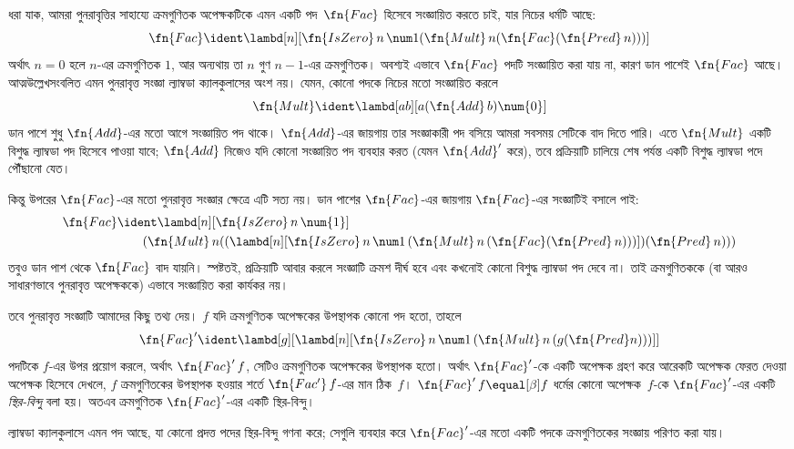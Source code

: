 \documentclass[../../../include/open-logic-section]{subfiles}
\begin{document}


ধরা যাক, আমরা পুনরাবৃত্তির সাহায্যে ক্রমগুণিতক অপেক্ষকটিকে এমন একটি
পদ~$\fn{Fac}$ হিসেবে সংজ্ঞায়িত করতে চাই, যার নিচের ধর্মটি আছে:
\[
\fn{Fac} \ident \lambd[n][\fn{IsZero}\, n\, \num 1 (\fn{Mult}\, n (\fn{Fac}(\fn{Pred} \, n)))]
\]
অর্থাৎ $n = 0$ হলে $n$-এর ক্রমগুণিতক $1$, আর অন্যথায় তা $n$ গুণ
$n-1$-এর ক্রমগুণিতক। অবশ্যই এভাবে $\fn{Fac}$ পদটি সংজ্ঞায়িত করা যায়
না, কারণ ডান পাশেই $\fn{Fac}$ আছে। আত্মউল্লেখসংবলিত এমন পুনরাবৃত্ত
সংজ্ঞা ল্যাম্বডা ক্যালকুলাসের অংশ নয়। যেমন, কোনো পদকে নিচের মতো
সংজ্ঞায়িত করলে
\[
\fn{Mult} \ident \lambd[ab][a (\fn{Add}\, b) \num{0}]
\]
ডান পাশে শুধু $\fn{Add}$-এর মতো আগে সংজ্ঞায়িত পদ থাকে। $\fn{Add}$-এর
জায়গায় তার সংজ্ঞাকারী পদ বসিয়ে আমরা সবসময় সেটিকে বাদ দিতে পারি। এতে
$\fn{Mult}$ একটি বিশুদ্ধ ল্যাম্বডা পদ হিসেবে পাওয়া যাবে; $\fn{Add}$
নিজেও যদি কোনো সংজ্ঞায়িত পদ ব্যবহার করত (যেমন $\fn{Add}'$ করে), তবে
প্রক্রিয়াটি চালিয়ে শেষ পর্যন্ত একটি বিশুদ্ধ ল্যাম্বডা পদে পৌঁছানো যেত।

কিন্তু উপরের $\fn{Fac}$-এর মতো পুনরাবৃত্ত সংজ্ঞার ক্ষেত্রে এটি সত্য নয়।
ডান পাশের $\fn{Fac}$-এর জায়গায় $\fn{Fac}$-এর সংজ্ঞাটিই বসালে পাই:
\begin{align*}
  \fn{Fac} & \ident \lambd[n][\fn{IsZero}\, n\, \num{1}] \\
    & \qquad (\fn{Mult}\, n
  ((\lambd[n][\fn{IsZero} \, n \, \num 1\, (\fn{Mult}\, n\, (\fn{Fac}
    (\fn{Pred}\, n)))]) (\fn{Pred}\, n)))
\end{align*}
তবুও ডান পাশ থেকে $\fn{Fac}$ বাদ যায়নি। স্পষ্টতই, প্রক্রিয়াটি আবার
করলে সংজ্ঞাটি ক্রমশ দীর্ঘ হবে এবং কখনোই কোনো বিশুদ্ধ ল্যাম্বডা পদ দেবে
না। তাই ক্রমগুণিতককে (বা আরও সাধারণভাবে পুনরাবৃত্ত অপেক্ষককে) এভাবে
সংজ্ঞায়িত করা কার্যকর নয়।

তবে পুনরাবৃত্ত সংজ্ঞাটি আমাদের কিছু তথ্য দেয়। $f$ যদি ক্রমগুণিতক
অপেক্ষকের উপস্থাপক কোনো পদ হতো, তাহলে
\[
\fn{Fac}' \ident \lambd[g][\lambd[n][\fn{IsZero} \, n \, \num 1\, (\fn{Mult} \, n\, (g (\fn{Pred} n)))]]
\]
পদটিকে $f$-এর উপর প্রয়োগ করলে, অর্থাৎ $\fn{Fac}'\,f$, সেটিও
ক্রমগুণিতক অপেক্ষকের উপস্থাপক হতো। অর্থাৎ $\fn{Fac}'$-কে একটি অপেক্ষক
গ্রহণ করে আরেকটি অপেক্ষক ফেরত দেওয়া অপেক্ষক হিসেবে দেখলে,
$f$ ক্রমগুণিতকের উপস্থাপক হওয়ার শর্তে $\fn{Fac'}\, f$-এর মান ঠিক~$f$।
$\fn{Fac}' \, f \equal[\beta] f$ ধর্মের কোনো অপেক্ষক~$f$-কে
$\fn{Fac}'$-এর একটি \emph{স্থির-বিন্দু} বলা হয়। অতএব ক্রমগুণিতক
$\fn{Fac}'$-এর একটি স্থির-বিন্দু।

ল্যাম্বডা ক্যালকুলাসে এমন পদ আছে, যা কোনো প্রদত্ত পদের স্থির-বিন্দু
গণনা করে; সেগুলি ব্যবহার করে $\fn{Fac}'$-এর মতো একটি পদকে ক্রমগুণিতকের
সংজ্ঞায় পরিণত করা যায়।
\end{document}

